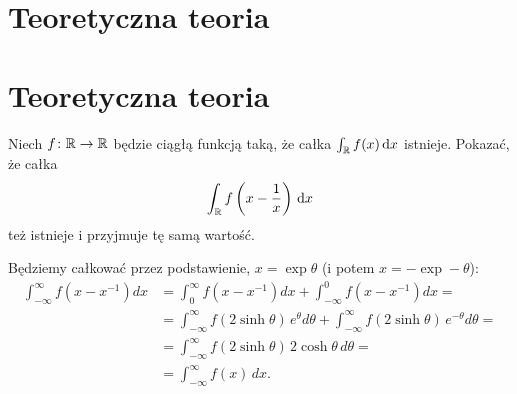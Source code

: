 %

\section{Teoretyczna teoria}
\section{Teoretyczna teoria} %

\begin{problem}
    \label{putnam_1968_b4}%
    Niech $f \colon {\mathbb R} \to {\mathbb R}$ będzie ciągłą funkcją taką, że całka $\int_{\mathbb R} f(x)\,\mathrm{d}x$ istnieje.
    Pokazać, że całka
    \begin{equation}
        \int_{\mathbb R} f\left(x - \frac 1 x\right)\,\mathrm{d}x
    \end{equation}
    też istnieje i przyjmuje tę samą wartość.
\end{problem}

\begin{solution}
    Będziemy całkować przez podstawienie, $x = \exp \theta$ (i potem $x = - \exp -\theta$):
    \begin{align}
        \int_{-\infty}^{\infty}f\left(x-x^{-1}\right)dx&=\int_{0}^{\infty}f\left(x-x^{-1}\right)dx+\int_{-\infty}^{0}f\left(x-x^{-1}\right)dx=\\
        &=\int_{-\infty}^{\infty}f(2\sinh\theta)\,e^{\theta}d\theta+\int_{-\infty}^{\infty}f(2\sinh\theta)\,e^{-\theta}d\theta=\\
        &=\int_{-\infty}^{\infty}f(2\sinh\theta)\,2\cosh\theta\,d\theta=\\
        &=\int_{-\infty}^{\infty}f(x)\,dx.
    \end{align}
\end{solution}

%